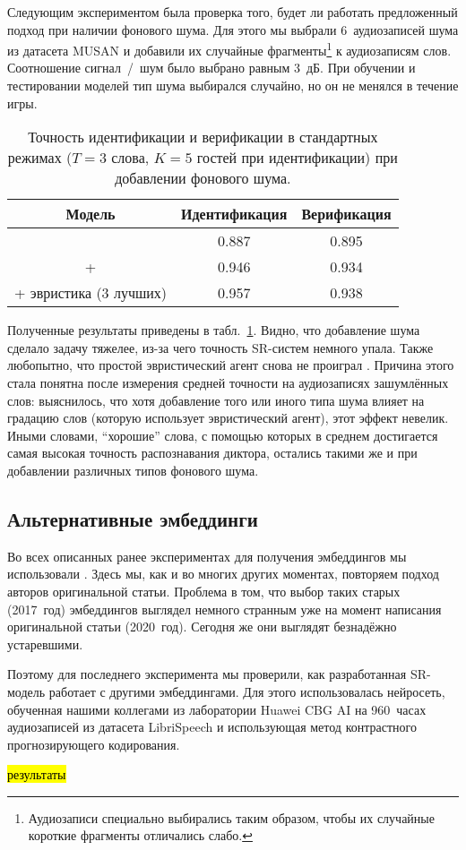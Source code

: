 Следующим экспериментом была проверка того, будет ли работать предложенный
подход при наличии фонового шума. Для этого мы выбрали 6~аудиозаписей шума
из датасета MUSAN\cite{musan2015} и добавили их случайные фрагменты\footnote{
    Аудиозаписи специально выбирались таким образом, чтобы их случайные
    короткие фрагменты отличались слабо.
} к аудиозаписям слов. Соотношение сигнал~/~шум было выбрано равным 3~дБ.
При обучении и тестировании моделей тип шума выбирался случайно, но он не
менялся в течение игры.

\begin{table}[htb]
    \begin{tabular}{c c c}
        \toprule
        Модель & Идентификация & Верификация\\
        \midrule
        \guesser{} & 0.887 & 0.895\\
        \guesser{} + \enquirer{} & 0.946 & 0.934\\
        \guesser{} + эвристика (3 лучших) & 0.957 & 0.938\\
        \bottomrule
    \end{tabular}
    \caption{Точность идентификации и верификации в стандартных режимах
    ($T = 3$ слова, $K = 5$ гостей при идентификации) при добавлении фонового
    шума.}
    \label{tab:noise}
\end{table}

Полученные результаты приведены в табл.~\ref{tab:noise}. Видно, что добавление
шума сделало задачу тяжелее, из-за чего точность SR-систем немного упала. Также
любопытно, что простой эвристический агент снова не проиграл \enquirer{}.
Причина этого стала понятна после измерения средней точности \guesser{} на
аудиозаписях зашумлённых слов: выяснилось, что хотя добавление того или иного
типа шума влияет на градацию слов (которую использует эвристический агент),
этот эффект невелик. Иными словами, ``хорошие'' слова, с помощью которых в
среднем достигается самая высокая точность распознавания диктора, остались
такими же и при добавлении различных типов фонового шума.

\subsection{Альтернативные эмбеддинги}\label{ssec:cpc}

Во всех описанных ранее экспериментах для получения эмбеддингов мы использовали
\xvector{}\cite{xvectorspaper}. Здесь мы, как и во многих других моментах,
повторяем подход авторов оригинальной статьи. Проблема в том, что выбор таких
старых (2017~год) эмбеддингов выглядел немного странным уже на момент написания
оригинальной статьи (2020~год). Сегодня же они выглядят безнадёжно устаревшими.

Поэтому для последнего эксперимента мы проверили, как разработанная SR-модель
работает с другими эмбеддингами. Для этого использовалась нейросеть, обученная
нашими коллегами из лаборатории Huawei CBG AI на 960~часах аудиозаписей из
датасета LibriSpeech\cite{librispeech} и использующая метод контрастного прогнозирующего
кодирования\cite{oord2019representation}.

\hl{результаты}
